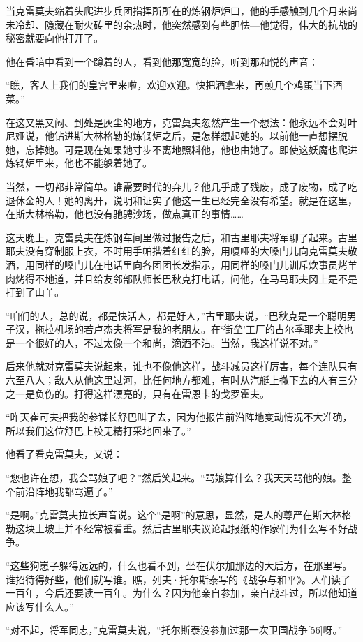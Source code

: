 当克雷莫夫缩着头爬进步兵团指挥所所在的炼钢炉炉口，他的手感触到几个月来尚未冷却、隐藏在耐火砖里的余热时，他突然感到有些胆怯—他觉得，伟大的抗战的秘密就要向他打开了。

他在昏暗中看到一个蹲着的人，看到他那宽宽的脸，听到那和悦的声音：

“瞧，客人上我们的皇宫里来啦，欢迎欢迎。快把酒拿来，再煎几个鸡蛋当下酒菜。”

在这又黑又闷、到处是灰尘的地方，克雷莫夫忽然产生一个想法：他永远不会对叶尼娅说，他钻进斯大林格勒的炼钢炉之后，是怎样想起她的。以前他一直想摆脱她，忘掉她。可是现在如果她寸步不离地照料他，他也由她了。即使这妖魔也爬进炼钢炉里来，他也不能躲着她了。

当然，一切都非常简单。谁需要时代的弃儿？他几乎成了残废，成了废物，成了吃退休金的人！她的离开，说明和证实了他这一生已经完全没有希望。就是在这里，在斯大林格勒，他也没有驰骋沙场，做点真正的事情……

这天晚上，克雷莫夫在炼钢车间里做过报告之后，和古里耶夫将军聊了起来。古里耶夫没有穿制服上衣，不时用手帕揩着红红的脸，用嗄哑的大嗓门儿向克雷莫夫敬酒，用同样的嗓门儿在电话里向各团团长发指示，用同样的嗓门儿训斥炊事员烤羊肉烤得不地道，并且给友邻部队师长巴秋克打电话，问他，在马马耶夫冈上是不是打到了山羊。

“咱们的人，总的说，都是快活人，都是好人，”古里耶夫说，“巴秋克是一个聪明男子汉，拖拉机场的若卢杰夫将军是我的老朋友。在‘街垒’工厂的古尔季耶夫上校也是一个很好的人，不过太像一个和尚，滴酒不沾。当然，我这样说不对。”

后来他就对克雷莫夫说起来，谁也不像他这样，战斗减员这样厉害，每个连队只有六至八人；敌人从他这里过河，比任何地方都难，有时从汽艇上撤下去的人有三分之一是负伤的。打得这样漂亮的，只有在雷恩卡的戈罗霍夫。

“昨天崔可夫把我的参谋长舒巴叫了去，因为他报告前沿阵地变动情况不大准确，所以我们这位舒巴上校无精打采地回来了。”

他看了看克雷莫夫，又说：

“您也许在想，我会骂娘了吧？”然后笑起来。“骂娘算什么？我天天骂他的娘。整个前沿阵地我都骂遍了。”

“是啊。”克雷莫夫拉长声音说。这个“是啊”的意思，显然，是人的尊严在斯大林格勒这块土坡上并不经常被看重。然后古里耶夫议论起报纸的作家们为什么写不好战争。

“这些狗崽子躲得远远的，什么也看不到，坐在伏尔加那边的大后方，在那里写。谁招待得好些，他们就写谁。瞧，列夫·托尔斯泰写的《战争与和平》。人们读了一百年，今后还要读一百年。为什么？因为他亲自参加，亲自战斗过，所以他知道应该写什么人。”

“对不起，将军同志，”克雷莫夫说，“托尔斯泰没参加过那一次卫国战争[56]呀。”

